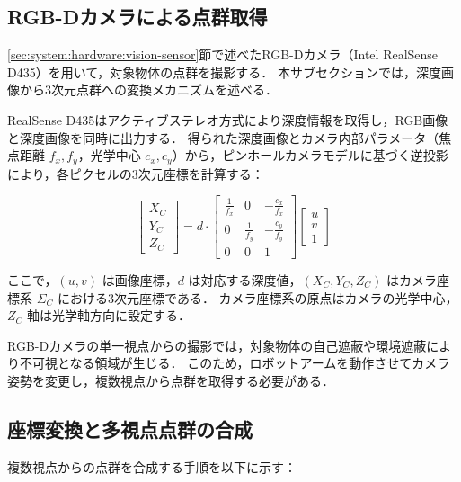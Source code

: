 \subsection{RGB-Dカメラによる点群取得}
\label{sec:system:pointcloud:acquisition:rgbd}
\ref{sec:system:hardware:vision-sensor}節で述べたRGB-Dカメラ（Intel RealSense D435）を用いて，対象物体の点群を撮影する．
本サブセクションでは，深度画像から3次元点群への変換メカニズムを述べる．

RealSense D435はアクティブステレオ方式により深度情報を取得し，RGB画像と深度画像を同時に出力する．
得られた深度画像とカメラ内部パラメータ（焦点距離 $f_x, f_y$，光学中心 $c_x, c_y$）から，ピンホールカメラモデルに基づく逆投影により，各ピクセルの3次元座標を計算する：

\begin{equation}
  \begin{bmatrix} X_C \\ Y_C \\ Z_C \end{bmatrix}
  = d \cdot
  \begin{bmatrix}
    \frac{1}{f_x} & 0 & -\frac{c_x}{f_x} \\
    0 & \frac{1}{f_y} & -\frac{c_y}{f_y} \\
    0 & 0 & 1
  \end{bmatrix}
  \begin{bmatrix} u \\ v \\ 1 \end{bmatrix}
  \label{eq:system:back_projection}
\end{equation}

ここで，$(u, v)$ は画像座標，$d$ は対応する深度値，$(X_C, Y_C, Z_C)$ はカメラ座標系 $\Sigma_C$ における3次元座標である．
カメラ座標系の原点はカメラの光学中心，$Z_C$ 軸は光学軸方向に設定する．

RGB-Dカメラの単一視点からの撮影では，対象物体の自己遮蔽や環境遮蔽により不可視となる領域が生じる．
このため，ロボットアームを動作させてカメラ姿勢を変更し，複数視点から点群を取得する必要がある．



\subsection{座標変換と多視点点群の合成}
\label{sec:system:pointcloud:acquisition:multi-view-fusion}
複数視点からの点群を合成する手順を以下に示す：

